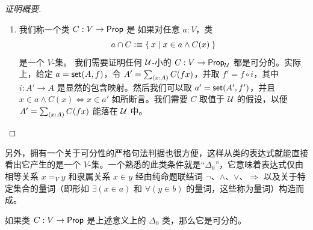 \begin{proof}[证明概要]
\begin{enumerate}
  \item 我们称一个类 $C: V\to\mathsf{Prop}$ 是 
    如果对任意 $a:V$，类
  \begin{equation*}
    a \cap C \vcentcolon\equiv\Set{x | x\in a \wedge C(x)}
  \end{equation*}
  是一个 $V$-集。
我们需要证明任何 $\mathcal{U}$-小的 $C: V \to \mathsf{Prop}_{\mathcal{U}}$ 都是可分的。实际上，给定 $a=\mathsf{set}(A,f)$，令 $A' = \sm{x:A}C(fx)$，并取 $f' = f\circ i$，其中 $i : A' \to A$ 是显然的包含映射。然后我们可以取 $a' = \mathsf{set}(A',f')$，并且 $x\in a\wedge C(x) \Leftrightarrow x\in a'$ 如所断言。我们需要 $C$ 取值于 $\mathcal{U}$ 的假设，以便 $A' = \sm{x:A}C(fx)$ 能落在 $\mathcal{U}$ 中。\qedhere
\end{enumerate}
\end{proof}

另外，拥有一个关于可分性的严格句法判据也很方便，这样从类的表达式就能直接看出它产生的是一个 $V$-集。一个熟悉的此类条件就是“$\Delta_0$”，它意味着表达式仅由相等关系 $x=_V y$ 和隶属关系 $x\in y$ 经由纯命题联结词 $\neg$、$\land$、$\lor$、$\Rightarrow$ 以及关于特定集合的量词（即形如 $\exists(x\in a)$ 和 $\forall(y\in b)$ 的量词，这些称为量词）构造而成。%

\begin{cor}\label{cor:Delta0sep}
如果类 $C: V \to \mathsf{Prop}$ 是上述意义上的 $\Delta_0$ 类，那么它是可分的。
\end{cor}


%

